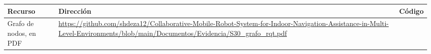 \begin{table}[H]
  \centering\small
  \renewcommand{\arraystretch}{1.3}
  \begin{tabular}{@{}p{} p{} c@{}}
    \toprule
    \textbf{Recurso} & \textbf{Dirección} & \textbf{Código} \\ \midrule
    Grafo de nodos, en PDF & \url{https://github.com/shdeza12/Collaborative-Mobile-Robot-System-for-Indoor-Navigation-Assistance-in-Multi-Level-Environments/blob/main/Documentos/Evidencia/S30_grafo_rqt.pdf} & \raisebox{-0.85\height}{\qrcode[height=2cm]{https://github.com/shdeza12/Collaborative-Mobile-Robot-System-for-Indoor-Navigation-Assistance-in-Multi-Level-Environments/blob/main/Documentos/Evidencia/S30_grafo_rqt.pdf}} \\ \bottomrule
  \end{tabular}
\end{table}

